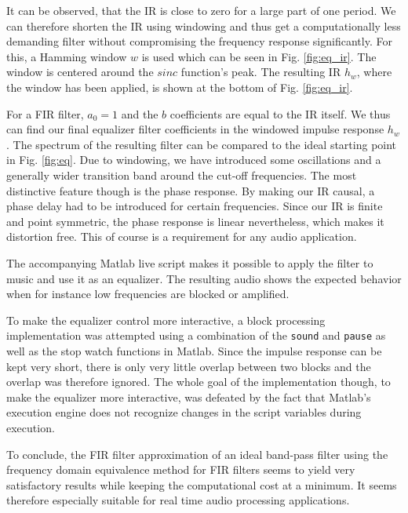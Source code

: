 \documentclass[journal]{IEEEtran}
\begin{document}
It can be observed, that the IR is close to zero for a large part of one period. We can therefore shorten the IR using windowing and thus get a computationally less demanding filter without compromising the frequency response significantly. For this, a Hamming window $w$ is used which can be seen in Fig. \ref{fig:eq_ir}. The window is centered around the $sinc$ function's peak. The resulting IR $h_w$, where the window has been applied, is shown at the bottom of Fig. \ref{fig:eq_ir}.

For a FIR filter, $a_0 = 1$ and the $b$ coefficients are equal to the IR itself. We thus can find our final equalizer filter coefficients in the windowed impulse response $h_w$. The spectrum of the resulting filter can be compared to the ideal starting point in Fig. \ref{fig:eq}. Due to windowing, we have introduced some oscillations and a generally wider transition band around the cut-off frequencies. The most distinctive feature though is the phase response. By making our IR causal, a phase delay had to be introduced for certain frequencies. Since our IR is finite and point symmetric, the phase response is linear nevertheless, which makes it distortion free. This of course is a requirement for any audio application. 

The accompanying Matlab live script makes it possible to apply the filter to music and use it as an equalizer. The resulting audio shows the expected behavior when for instance low frequencies are blocked or amplified. 

To make the equalizer control more interactive, a block processing implementation was attempted using a combination of the \texttt{sound} and \texttt{pause} as well as the stop watch functions in Matlab. Since the impulse response can be kept very short, there is only very little overlap between two blocks and the overlap was therefore ignored. The whole goal of the implementation though, to make the equalizer more interactive, was defeated by the fact that Matlab's execution engine does not recognize changes in the script variables during execution.

To conclude, the FIR filter approximation of an ideal band-pass filter using the frequency domain equivalence method for FIR filters seems to yield very satisfactory results while keeping the computational cost at a minimum. It seems therefore especially suitable for real time audio processing applications.
\end{document}
